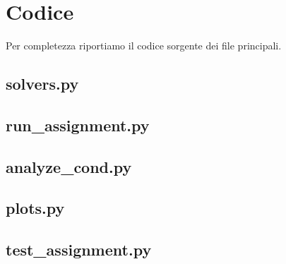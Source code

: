 \documentclass[11pt,a4paper]{article}
\begin{document}
\section{Codice}\label{sec:codice}
Per completezza riportiamo il codice sorgente dei file principali.

\subsection{solvers.py}


\subsection{run\_assignment.py}


\subsection{analyze\_cond.py}


\subsection{plots.py}


\subsection{test\_assignment.py}

\end{document}
